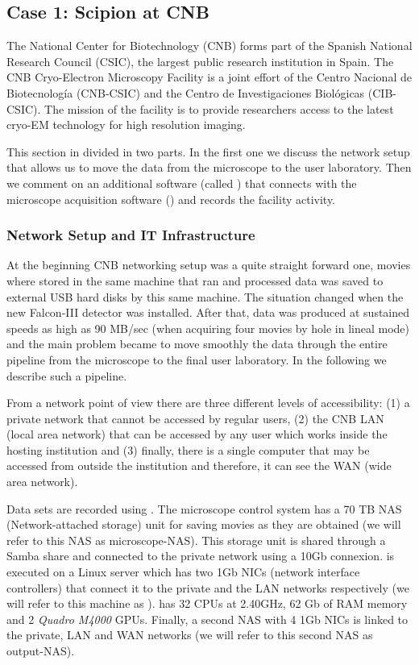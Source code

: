 \subsection{Case 1: Scipion at CNB}
The National Center for Biotechnology (CNB) forms part of the Spanish National Research Council (CSIC), the largest public research institution in Spain. 
The CNB Cryo-Electron Microscopy Facility is a joint effort of the Centro Nacional de Biotecnolog\'{i}a (CNB-CSIC) and the Centro de Investigaciones Biol\'{o}gicas (CIB-CSIC). The mission of the facility is to provide researchers access to the latest cryo-EM technology for high resolution imaging. 

This section in divided in two parts. In the first one we discuss the network setup that allows us to move the data from the microscope to the user laboratory. Then  we comment on an additional software (called  \emadmin) that connects \scipion with the microscope acquisition software (\epu) and records the facility activity.

\subsubsection{Network Setup and IT Infrastructure}

At the beginning CNB networking setup was a quite straight forward one, movies where stored in the  same machine that ran \scipion and processed data was saved to external USB hard disks by this same machine. The situation changed when the new Falcon-III detector was installed. After that, data was produced at sustained speeds as high as 90 MB/sec (when acquiring four movies by hole in lineal mode) and the main problem became to move smoothly the data through the entire pipeline from the microscope to the final user laboratory. In the following we describe such a pipeline.

From a network point of view there are three different levels of accessibility: (1) a private network that cannot be accessed by regular users, (2) the CNB LAN (local area network)  that can be accessed by any user which works inside the hosting  institution and (3) finally, there is a single computer that may be accessed from outside the institution and therefore, it can see the WAN (wide area network).

Data sets are recorded using \epu. The microscope control system has a 70 TB NAS (Network-attached storage) unit for saving movies as they are obtained (we will refer to this NAS as microscope-NAS). This storage unit is shared through a Samba share and connected to the private network using a 10Gb connexion. \scipion is executed on a Linux server which has two 1Gb NICs (network interface controllers) that connect it to the private and the LAN networks respectively (we will refer to this machine as \scipionbox). \scipionbox has 32 CPUs at 2.40GHz, 62 Gb of RAM memory and 2 \textit{Quadro M4000} GPUs. Finally, a second NAS with 4 1Gb NICs is linked to the private, LAN and WAN networks (we will refer to this second NAS as output-NAS).

